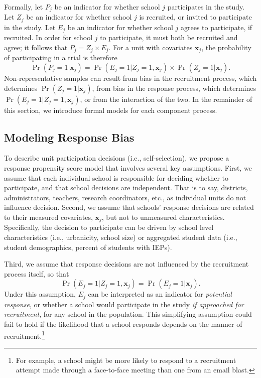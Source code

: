\documentclass[
  english,
  man,floatsintext]{apa6}
\begin{document}
Formally, let \(P_j\) be an indicator for whether school \(j\) participates in the study. Let \(Z_j\) be an indicator for whether school \(j\) is recruited, or invited to participate in the study. Let \(E_j\) be an indicator for whether school \(j\) agrees to participate, if recruited. In order for school \(j\) to participate, it must both be recruited and agree; it follows that \(P_j = Z_j \times E_j\). For a unit with covariates \(\mathbf{x}_j\), the probability of participating in a trial is therefore
\begin{equation}
\label{eq:PZEX}
\Pr\left(P_j = 1 | \mathbf{x}_j \right) = \Pr\left(E_j = 1 | Z_j = 1, \mathbf{x}_j \right) \times \Pr\left(Z_j = 1 | \mathbf{x}_j \right).
\end{equation}
Non-representative samples can result from bias in the recruitment process, which determines \(\Pr\left(Z_j = 1 | \mathbf{x}_j \right)\), from bias in the response process, which determines \(\Pr\left(E_j = 1 | Z_j = 1, \mathbf{x}_j \right)\), or from the interaction of the two.
In the remainder of this section, we introduce formal models for each component process.

\hypertarget{modeling-response-bias}{%
\subsection{Modeling Response Bias}\label{modeling-response-bias}}

To describe unit participation decisions (i.e., self-selection), we propose a response propensity score model that involves several key assumptions.
First, we assume that each individual school is responsible for deciding whether to participate, and that school decisions are independent.
That is to say, districts, administrators, teachers, research coordinators, etc., as individual units do not influence decision.
Second, we assume that schools' response decisions are related to their measured covariates, \(\mathbf{x}_j\), but not to unmeasured characteristics. Specifically, the decision to participate can be driven by school level characteristics (i.e., urbanicity, school size) or aggregated student data (i.e., student demographics, percent of students with IEPs).

Third, we assume that response decisions are not influenced by the recruitment process itself, so that
\begin{equation}
\label{eq:potential-participation}
\Pr\left(E_j = 1 | Z_j = 1, \mathbf{x}_j \right) = \Pr\left(E_j = 1 | \mathbf{x}_j \right).
\end{equation}
Under this assumption, \(E_j\) can be interpreted as an indicator for \emph{potential response}, or whether a school would participate in the study \emph{if approached for recruitment}, for any school in the population.
This simplifying assumption could fail to hold if the likelihood that a school responds depends on the manner of recruitment.\footnote{For example, a school might be more likely to respond to a recruitment attempt made through a face-to-face meeting than one from an email blast.}
\end{document}

